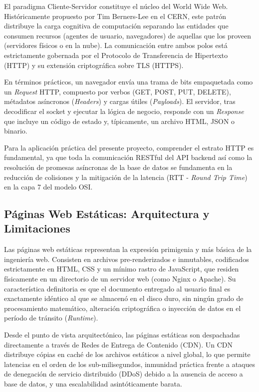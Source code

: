 \documentclass[11pt,a4paper,oneside]{report}
\begin{document}
El paradigma Cliente-Servidor constituye el n\'ucleo del World Wide Web. Hist\'oricamente propuesto por Tim Berners-Lee en el CERN, este patr\'on distribuye la carga cognitiva de computaci\'on separando las entidades que consumen recursos (agentes de usuario, navegadores) de aquellas que los proveen (servidores f\'isicos o en la nube). La comunicaci\'on entre ambos polos est\'a estrictamente gobernada por el Protocolo de Transferencia de Hipertexto (HTTP) y su extensi\'on criptogr\'afica sobre TLS (HTTPS).

En t\'erminos pr\'acticos, un navegador env\'ia una trama de bits empaquetada como un \textit{Request} HTTP, compuesto por verbos (GET, POST, PUT, DELETE), m\'etadatos as\'incronos (\textit{Headers}) y cargas \'utiles (\textit{Payloads}). El servidor, tras decodificar el socket y ejecutar la l\'ogica de negocio, responde con un \textit{Response} que incluye un c\'odigo de estado y, t\'ipicamente, un archivo HTML, JSON o binario.

Para la aplicaci\'on pr\'actica del presente proyecto, comprender el estrato HTTP es fundamental, ya que toda la comunicaci\'on RESTful del API backend as\'i como la resoluci\'on de promesas as\'incronas de la base de datos se fundamenta en la reducci\'on de colisiones y la mitigaci\'on de la latencia (RTT - \textit{Round Trip Time}) en la capa 7 del modelo OSI.

\subsection{P\'aginas Web Est\'aticas: Arquitectura y Limitaciones}

Las p\'aginas web est\'aticas representan la expresi\'on primigenia y m\'as b\'asica de la ingenier\'ia web. Consisten en archivos pre-renderizados e inmutables, codificados estrictamente en HTML, CSS y un m\'inimo rastro de JavaScript, que residen f\'isicamente en un directorio de un servidor web (como Nginx o Apache). Su caracter\'istica definitoria es que el documento entregado al usuario final es exactamente id\'entico al que se almacen\'o en el disco duro, sin ning\'un grado de procesamiento matem\'atico, alteraci\'on criptogr\'afica o inyecci\'on de datos en el per\'iodo de tr\'ansito (\textit{Runtime}).

Desde el punto de vista arquitect\'onico, las p\'aginas est\'aticas son despachadas directamente a trav\'es de Redes de Entrega de Contenido (CDN). Un CDN distribuye c\'opias en cach\'e de los archivos est\'aticos a nivel global, lo que permite latencias en el orden de los sub-milisegundos, inmunidad pr\'actica frente a ataques de denegaci\'on de servicio distribuido (DDoS) debido a la ausencia de acceso a base de datos, y una escalabilidad asint\'oticamente barata.
\end{document}
